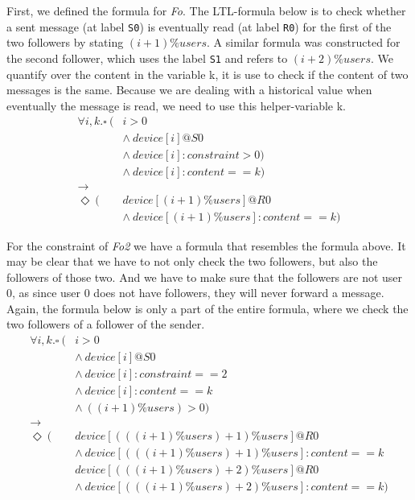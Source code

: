 \documentclass[10pt,a4paper]{article}
\begin{document}
	First, we defined the formula for \textit{Fo}. The LTL-formula below is to check whether a sent message (at label \texttt{S0}) is eventually read (at label \texttt{R0}) for the first of the two followers by stating $(i+1) \% users$. A similar formula was constructed for the second follower, which uses the label \texttt{S1} and refers to  $(i+2) \% users$. We quantify over the content in the variable k, it is use to check if the content of two messages is the same. Because we are dealing with a historical value when eventually the message is read, we need to use this helper-variable k.
	\begin{align*}
	\forall i, k. 
	\square\ ( & i > 0 \\
	& \wedge\ device[i]@S0 \\
	& \wedge\ device[i]:constraint > 0 ) \\
	& \wedge\ device[i]:content == k ) \\
	\rightarrow & \\
	\Diamond\ ( & device[(i+1) \%  users]@R0 \\
	& \wedge\ device[(i+1) \% users]:content == k)
	\end{align*}
	
	For the constraint of \textit{Fo2} we have a formula that resembles the formula above. It may be clear that we have to not only check the two followers, but also the followers of those two.
	And we have to make sure that the followers are not user 0, as since user 0 does not have followers, they will never forward a message. Again, the formula below is only a part of the entire formula, where we check the two followers of a follower of the sender.
	\begin{align*}
	\forall i, k. 
	\square\ ( & i > 0 \\
	& \wedge\ device[i]@S0 \\
	& \wedge\ device[i]:constraint == 2 \\
	& \wedge\ device[i]:content == k \\
	& \wedge\ ((i+1)\%users) > 0) \\
	\rightarrow\ & \\
	\Diamond\ ( & device[(((i+1) \% users)+1) \%  users]@R0 \\
	& \wedge\ device[(((i+1) \% users)+1) \%  users]:content == k \\
	& device[(((i+1) \% users)+2) \%  users]@R0 \\
	& \wedge\ device[(((i+1) \% users)+2) \%  users]:content == k)
	\end{align*}
	
\end{document}
